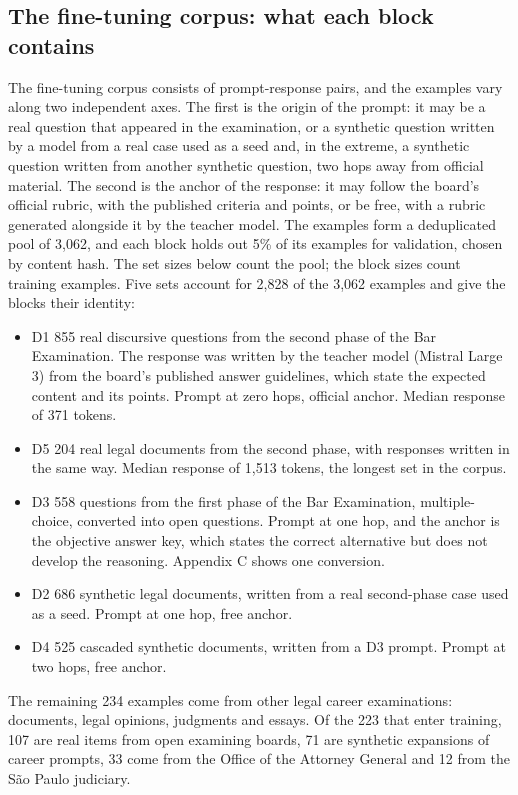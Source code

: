 \documentclass{IOS-Book-Article}
\begin{document}
\subsection{The fine-tuning corpus: what each block contains}
The fine-tuning corpus consists of prompt-response pairs, and the examples vary along two independent axes. The first is the origin of the prompt: it may be a real question that appeared in the examination, or a synthetic question written by a model from a real case used as a seed and, in the extreme, a synthetic question written from another synthetic question, two hops away from official material. The second is the anchor of the response: it may follow the board's official rubric, with the published criteria and points, or be free, with a rubric generated alongside it by the teacher model.
The examples form a deduplicated pool of 3,062, and each block holds out 5\% of its examples for validation, chosen by content hash. The set sizes below count the pool; the block sizes count training examples. Five sets account for 2,828 of the 3,062 examples and give the blocks their identity:
\begin{itemize}
\item D1 \textperiodcentered{} 855 real discursive questions from the second phase of the Bar Examination. The response was written by the teacher model (Mistral Large 3) from the board's published answer guidelines, which state the expected content and its points. Prompt at zero hops, official anchor. Median response of 371 tokens.
\item D5 \textperiodcentered{} 204 real legal documents from the second phase, with responses written in the same way. Median response of 1,513 tokens, the longest set in the corpus.
\item D3 \textperiodcentered{} 558 questions from the first phase of the Bar Examination, multiple-choice, converted into open questions. Prompt at one hop, and the anchor is the objective answer key, which states the correct alternative but does not develop the reasoning. Appendix C shows one conversion.
\item D2 \textperiodcentered{} 686 synthetic legal documents, written from a real second-phase case used as a seed. Prompt at one hop, free anchor.
\item D4 \textperiodcentered{} 525 cascaded synthetic documents, written from a D3 prompt. Prompt at two hops, free anchor.
\end{itemize}
The remaining 234 examples come from other legal career examinations: documents, legal opinions, judgments and essays. Of the 223 that enter training, 107 are real items from open examining boards, 71 are synthetic expansions of career prompts, 33 come from the Office of the Attorney General and 12 from the São Paulo judiciary.
\end{document}
